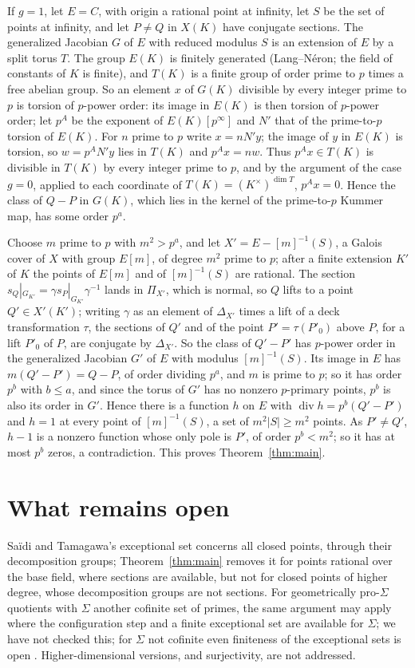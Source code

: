 \documentclass[11pt]{amsart}
\theoremstyle{remark}
\DeclareMathOperator{\divi}{div}
\begin{document}
If $g=1$, let $E=C$, with origin a rational point at infinity, let $S$ be the set of points at infinity, and let $P\ne Q$ in $X(K)$ have conjugate sections. The generalized Jacobian $G$ of $E$ with reduced modulus $S$ is an extension of $E$ by a split torus $T$. The group $E(K)$ is finitely generated (Lang--N\'eron; the field of constants of $K$ is finite), and $T(K)$ is a finite group of order prime to $p$ times a free abelian group. So an element $x$ of $G(K)$ divisible by every integer prime to $p$ is torsion of $p$-power order: its image in $E(K)$ is then torsion of $p$-power order; let $p^A$ be the exponent of $E(K)[p^\infty]$ and $N'$ that of the prime-to-$p$ torsion of $E(K)$. For $n$ prime to $p$ write $x=nN'y$; the image of $y$ in $E(K)$ is torsion, so $w=p^AN'y$ lies in $T(K)$ and $p^Ax=nw$. Thus $p^Ax\in T(K)$ is divisible in $T(K)$ by every integer prime to $p$, and by the argument of the case $g=0$, applied to each coordinate of $T(K)=(K^\times)^{\dim T}$, $p^Ax=0$. Hence the class of $Q-P$ in $G(K)$, which lies in the kernel of the prime-to-$p$ Kummer map, has some order $p^a$.

Choose $m$ prime to $p$ with $m^2>p^a$, and let $X'=E-[m]^{-1}(S)$, a Galois cover of $X$ with group $E[m]$, of degree $m^2$ prime to $p$; after a finite extension $K'$ of $K$ the points of $E[m]$ and of $[m]^{-1}(S)$ are rational. The section $s_Q|_{G_{K'}}=\gamma s_P|_{G_{K'}}\gamma^{-1}$ lands in $\Pi_{X'}$, which is normal, so $Q$ lifts to a point $Q'\in X'(K')$; writing $\gamma$ as an element of $\Delta_{X'}$ times a lift of a deck transformation $\tau$, the sections of $Q'$ and of the point $P'=\tau(P'_0)$ above $P$, for a lift $P'_0$ of $P$, are conjugate by $\Delta_{X'}$. So the class of $Q'-P'$ has $p$-power order in the generalized Jacobian $G'$ of $E$ with modulus $[m]^{-1}(S)$. Its image in $E$ has $m(Q'-P')=Q-P$, of order dividing $p^a$, and $m$ is prime to $p$; so it has order $p^b$ with $b\le a$, and since the torus of $G'$ has no nonzero $p$-primary points, $p^b$ is also its order in $G'$. Hence there is a function $h$ on $E$ with $\divi h=p^b(Q'-P')$ and $h=1$ at every point of $[m]^{-1}(S)$, a set of $m^2|S|\ge m^2$ points. As $P'\ne Q'$, $h-1$ is a nonzero function whose only pole is $P'$, of order $p^b<m^2$; so it has at most $p^b$ zeros, a contradiction. This proves Theorem~\ref{thm:main}.

\section{What remains open}
Sa\"idi and Tamagawa's exceptional set concerns all closed points, through their decomposition groups; Theorem~\ref{thm:main} removes it for points rational over the base field, where sections are available, but not for closed points of higher degree, whose decomposition groups are not sections. For geometrically pro-$\Sigma$ quotients with $\Sigma$ another cofinite set of primes, the same argument may apply where the configuration step and a finite exceptional set are available for $\Sigma$; we have not checked this; for $\Sigma$ not cofinite even finiteness of the exceptional sets is open \cite[pp.~4--5]{ST18}. Higher-dimensional versions, and surjectivity, are not addressed.
\end{document}
